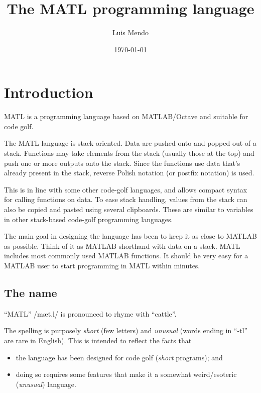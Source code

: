 \documentclass[12pt]{article}
\title{The MATL programming language}
\date{\today}
\author{Luis Mendo}
\begin{document}
\maketitle


\section{Introduction}

MATL is a programming language based on MATLAB/Octave and suitable for code golf.

The MATL language is stack-oriented. Data are pushed onto and popped out of a stack. Functions may take elements from the stack (usually those at the top) and push one or more outputs onto the stack. Since the functions use data that's already present in the stack, reverse Polish notation (or postfix notation) is used.

This is in line with some other code-golf languages, and allows compact syntax for calling functions on data. To ease stack handling, values from the stack can also be copied and pasted using several clipboards. These are similar to variables in other stack-based code-golf programming languages. %

The main goal in designing the language has been to keep it as close to MATLAB as possible. Think of it as MATLAB shorthand with data on a stack. MATL includes most commonly used MATLAB functions. It should be very easy for a MATLAB user to start programming in MATL within minutes.



\subsection{The name}

``MATL'' /\textsf{\textprimstress m\ae t.\textsecstress l}/ is pronounced to rhyme with ``cattle''.

The spelling is purposely \emph{short} (few letters) and \emph{unusual} (words ending in \mbox{``-tl''} are rare in English). This is intended to reflect the facts that
\begin{itemize}
\item
the language has been designed for code golf (\emph{short} programs); and
\item
doing so requires some features that make it a somewhat weird/esoteric (\emph{unusual}) language.
\end{itemize}
\end{document}

